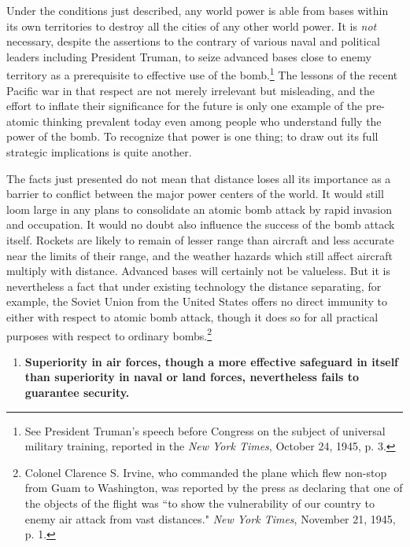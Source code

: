Under the conditions just described, any world power is able from bases within its own territories to destroy all the cities of any other world power. It is \emph{not} necessary, despite the assertions to the contrary of various naval and political leaders including President Truman, to seize advanced bases close to enemy territory as a prerequisite to effective use of the bomb.\footnote{See President Truman's speech before Congress on the subject of universal military training, reported in the \textit{New York Times}, October 24, 1945, p. 3.} The lessons of the recent Pacific war in that respect are not merely irrelevant but misleading, and the effort to inflate their significance for the future is only one example of the pre-atomic thinking prevalent today even among people who understand fully the power of the bomb. To recognize that power is one thing; to draw out its full strategic implications is quite another.

The facts just presented do not mean that distance loses all its importance as a barrier to conflict between the major power centers of the world. It would still loom large in any plans to consolidate an atomic bomb attack by rapid invasion and occupation. It would no doubt also influence the success of the bomb attack itself. Rockets are likely to remain of lesser range than aircraft and less accurate near the limits of their range, and the weather hazards which still affect aircraft multiply with distance. Advanced bases will certainly not be valueless. But it is nevertheless a fact that under existing technology the distance separating, for example, the Soviet Union from the United States offers no direct immunity to either with respect to atomic bomb attack, though it does so for all practical purposes with respect to ordinary bombs.\footnote{Colonel Clarence S. Irvine, who commanded the plane which flew non-stop from Guam to Washington, was reported by the press as declaring that one of the objects of the flight was ``to show the vulnerability of our country to enemy air attack from vast distances." \textit{New York Times}, November 21, 1945, p. 1.}

\label{I-range2}

\begin{enumerate}[resume*]

\item \textbf{Superiority in air forces, though a more effective safeguard in itself than superiority in naval or land forces, nevertheless fails to guarantee security.}

\end{enumerate}


